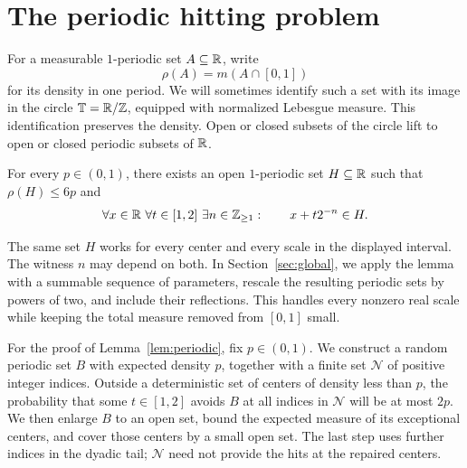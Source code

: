 \section{The periodic hitting problem}\label{sec:periodic}

For a measurable $1$-periodic set $A\subseteq\mathbb R$, write
\[
 \rho(A)=m(A\cap[0,1])
\]
for its density in one period. We will sometimes identify such a set
with its image in the circle $\mathbb T=\mathbb R/\mathbb Z$, equipped with normalized
Lebesgue measure. This identification preserves the density. Open or
closed subsets of the circle lift to open or closed periodic subsets of
$\mathbb R$.

\begin{lemma}\label{lem:periodic}
For every $p\in(0,1)$, there exists an open $1$-periodic set $H\subseteq\mathbb R$
such that $\rho(H)\le6p$ and
\[
 \forall x\in\R\ \forall t\in[1,2]\ \exists n\in\mathbb Z_{\ge1}:
 \qquad x+t2^{-n}\in H.
\]
\end{lemma}

The same set $H$ works for every center and every scale in the displayed
interval. The witness $n$ may depend on both. In
Section~\ref{sec:global}, we apply the lemma with a summable sequence of
parameters, rescale the resulting periodic sets by powers of two, and
include their reflections. This handles every nonzero real scale while
keeping the total measure removed from $[0,1]$ small.

For the proof of Lemma~\ref{lem:periodic}, fix $p\in(0,1)$. We construct
a random periodic set $B$ with expected density $p$, together with a
finite set $\mathcal N$ of positive integer indices. Outside a
deterministic set of centers of density less than $p$, the probability
that some $t\in[1,2]$ avoids $B$ at all indices in $\mathcal N$ will be
at most $2p$. We then enlarge $B$ to an open set, bound the expected
measure of its exceptional centers, and cover those centers by a small
open set. The last step uses further indices in the dyadic tail;
$\mathcal N$ need not provide the hits at the repaired centers.
